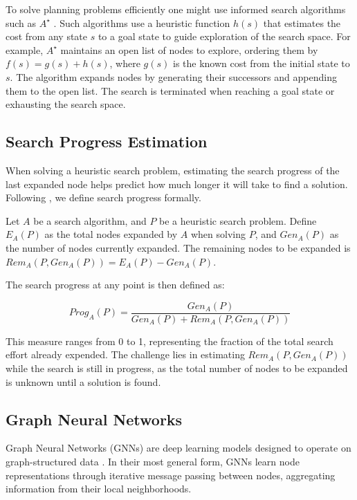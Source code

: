 \documentclass[letterpaper]{article}
\begin{document}
To solve planning problems efficiently one might use informed search algorithms such as $A^{\star}$ \citep{hart1968formal}. Such algorithms use a heuristic function $h(s)$ that estimates the cost from any state $s$ to a goal state to guide exploration of the search space. For example, $A^{\star}$ maintains an open list of nodes to explore, ordering them by $f(s) = g(s) + h(s)$, where $g(s)$ is the known cost from the initial state to $s$. The algorithm expands nodes by generating their successors and appending them to the open list. The search is terminated when reaching a goal state or exhausting the search space.

\subsection{Search Progress Estimation}

When solving a heuristic search problem, estimating the search progress of the last expanded node helps predict how much longer it will take to find a solution. Following \cite{sudry2022learning}, we define search progress formally.

Let $A$ be a search algorithm, and $P$ be a heuristic search problem. Define $E_A(P)$ as the total nodes expanded by $A$ when solving $P$, and $Gen_A(P)$ as the number of nodes currently expanded. The remaining nodes to be expanded is $Rem_A(P, Gen_A(P)) = E_A(P) - Gen_A(P)$.

The search progress at any point is then defined as:

\begin{equation*}
    Prog_A(P) = \frac{Gen_A(P)}{Gen_A(P) + Rem_A(P, Gen_A(P))}
\end{equation*}

This measure ranges from 0 to 1, representing the fraction of the total search effort already expended. The challenge lies in estimating $Rem_A(P, Gen_A(P))$ while the search is still in progress, as the total number of nodes to be expanded is unknown until a solution is found.

\subsection{Graph Neural Networks}
Graph Neural Networks (GNNs) are deep learning models designed to operate on graph-structured data \citep{scarselli2008graph}. In their most general form, GNNs learn node representations through iterative message passing between nodes, aggregating information from their local neighborhoods.
\end{document}
